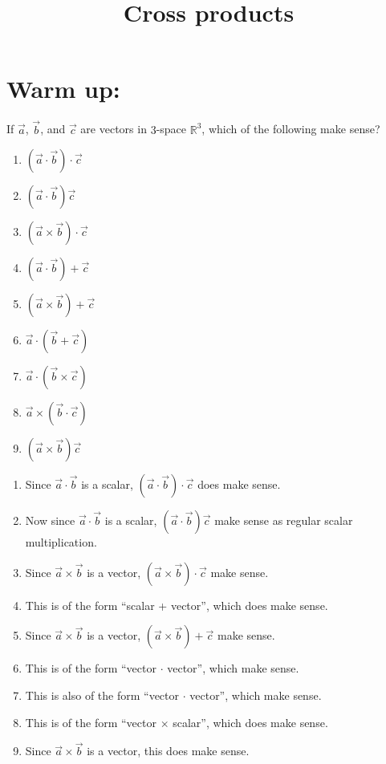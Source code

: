 \documentclass[]{ximera}
\title{Cross products}
\begin{document}
\begin{abstract}		\end{abstract}
\maketitle



\section{Warm up:}
If $\vec{a}$, $\vec{b}$, and $\vec{c}$ are vectors in $3$-space $\mathbb{R}^3$, which of the following make sense?
	\begin{multicols}{3}
	\begin{enumerate}
	\item  $(\vec{a} \cdot \vec{b}) \cdot \vec{c}$
	\item  $(\vec{a} \cdot \vec{b})\vec{c}$
	\item  $(\vec{a} \times \vec{b}) \cdot \vec{c}$
	\item  $(\vec{a} \cdot \vec{b}) + \vec{c}$
	\item  $(\vec{a} \times \vec{b}) + \vec{c}$
	\item  $\vec{a} \cdot (\vec{b} + \vec{c})$
	\item  $\vec{a} \cdot (\vec{b} \times \vec{c})$
	\item  $\vec{a} \times (\vec{b} \cdot \vec{c})$
	\item  $(\vec{a} \times \vec{b}) \vec{c}$
	\end{enumerate}
	\end{multicols}
	
	\begin{freeResponse}
	\begin{enumerate}
	\item  Since $\vec{a} \cdot \vec{b}$ is a scalar, $(\vec{a} \cdot \vec{b}) \cdot \vec{c}$ does  make sense.
	\item  Now since $\vec{a} \cdot \vec{b}$ is a scalar, $(\vec{a} \cdot \vec{b})\vec{c}$  make sense as regular scalar multiplication.
	\item  Since $\vec{a} \times \vec{b}$ is a vector, $(\vec{a} \times \vec{b}) \cdot \vec{c}$  make sense.
	\item  This is of the form ``scalar + vector'', which does  make sense.
	\item  Since $\vec{a} \times \vec{b}$ is a vector, $(\vec{a} \times \vec{b}) + \vec{c}$  make sense.
	\item  This is of the form ``vector $\cdot$ vector'', which  make sense.
	\item  This is also of the form ``vector $\cdot$ vector'', which  make sense.
	\item  This is of the form ``vector $\times$ scalar'', which does  make sense.
	\item  Since $\vec{a} \times \vec{b}$ is a vector, this does  make sense.
	\end{enumerate}
	\end{freeResponse}
	
\end{document}
